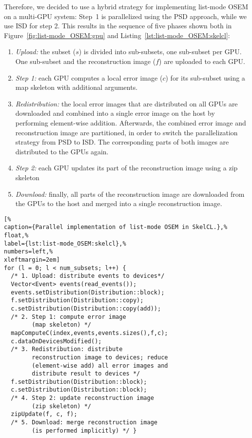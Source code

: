 Therefore, we decided to use a hybrid strategy for implementing list-mode OSEM on a multi-GPU system:
Step~1 is parallelized using the PSD approach, while we use ISD for step 2.
This results in the sequence of five phases shown both in Figure~\ref{fig:list-mode_OSEM:gpu} and Listing~\ref{lst:list-mode_OSEM:skelcl}:
\begin{enumerate}
\item \emph{Upload:} the subset ($s$) is divided into sub-subsets, one sub-subset per GPU.
      One sub-subset and the reconstruction image ($f$) are uploaded to each GPU.
\item \emph{Step 1:} each GPU computes a local error image ($c$) for its sub-subset using a map skeleton with additional arguments.
\item \emph{Redistribution:} the local error images that are distributed on all GPUs are downloaded and combined into a single error image on the host by performing element-wise addition.
      Afterwards, the combined error image and reconstruction image are partitioned, in order to switch the parallelization strategy from PSD to ISD.
      The corresponding parts of both images are distributed to the GPUs again.
\item \emph{Step 2:} each GPU updates its part of the reconstruction image using a zip skeleton
\item \emph{Download:} finally, all parts of the reconstruction image are downloaded from the GPUs to the host and merged into a single reconstruction image.
\end{enumerate}

\begin{lstlisting}[%
caption={Parallel implementation of list-mode OSEM in SkelCL.},%
float,%
label={lst:list-mode_OSEM:skelcl},%
numbers=left,%
xleftmargin=2em]
for (l = 0; l < num_subsets; l++) {
  /* 1. Upload: distribute events to devices*/
  Vector<Event> events(read_events());
  events.setDistribution(Distribution::block);
  f.setDistribution(Distribution::copy);
  c.setDistribution(Distribution::copy(add));
  /* 2. Step 1: compute error image
        (map skeleton) */
  mapComputeC(index,events,events.sizes(),f,c);
  c.dataOnDevicesModified();
  /* 3. Redistribution: distribute
        reconstruction image to devices; reduce
        (element-wise add) all error images and
        distribute result to devices */
  f.setDistribution(Distribution::block);
  c.setDistribution(Distribution::block);
  /* 4. Step 2: update reconstruction image
        (zip skeleton) */
  zipUpdate(f, c, f);
  /* 5. Download: merge reconstruction image
        (is performed implicitly) */ }
\end{lstlisting}

